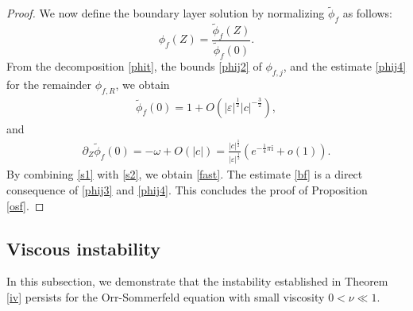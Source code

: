 \documentclass[reqno,11pt]{amsart}
\numberwithin{equation}{section}
\numberwithin{equation}{section}
\theoremstyle{plain}
\begin{document}
\begin{proof}
We now define the boundary layer solution by normalizing $\tilde{\phi}_f$ as follows:
 $$\phi_{f}(Z)=\frac{\tilde{\phi}_f(Z)}{\tilde{\phi}_f(0)}.$$
From the decomposition \eqref{phit}, the bounds \eqref{phij2} of $\phi_{f,j}$, and the estimate \eqref{phij4} for the remainder $\phi_{f,R}$, we obtain
\begin{align}\label{s1}
	\tilde{\phi}_{f}(0)=1+O(|\varepsilon|^{\frac12}|c|^{-\frac32}),
\end{align}
and
\begin{align}\label{s2}
	\partial_Z\tilde{\phi}_{f}(0)=-\omega+O(|c|)=\frac{|c|^{\frac12}}{|\varepsilon|^{\frac12}}\left(e^{-\frac{1}{4}\pi \mathrm{i}}+o(1)\right).
\end{align}
By combining \eqref{s1} with \eqref{s2}, we obtain \eqref{fast}. The estimate \eqref{bf} is a direct consequence of \eqref{phij3} and \eqref{phij4}. This concludes the proof of Proposition \ref{osf}.
\end{proof}


\subsection{Viscous instability}
In this subsection, we demonstrate that the instability established in Theorem \ref{iv} persists for the Orr-Sommerfeld equation with small viscosity $0<\nu\ll1$.
\end{document}
